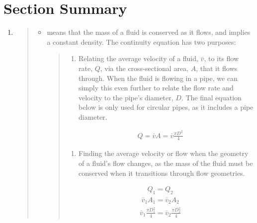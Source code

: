 \documentclass[letterpaper,10pt,english]{sphinxmanual}
\begin{document}
\section{Section Summary}
\label{\detokenize{Fluids_Review/Fluids_Review_Design:section-summary}}\label{\detokenize{Fluids_Review/Fluids_Review_Design:fr-section-summary}}\begin{enumerate}
\item {} 
\begin{quote}
\begin{itemize}
\item {} 
 means that the mass of a fluid is conserved as it flows, and implies a constant density. The continuity equation has two purposes:
\begin{quote}
\begin{enumerate}
\item {} 
Relating the average velocity of a fluid, \(\bar v\), to its flow rate, \(Q\), via the cross-sectional area, \(A\), that it flows through. When the fluid is flowing in a pipe, we can simply this even further to relate the flow rate and velocity to the pipe’s diameter, \(D\). The final equation below is only used for circular pipes, as it includes a pipe diameter.

\end{enumerate}
\begin{equation}\label{equation:Fluids_Review/Fluids_Review_Design:Fluids_Review/Fluids_Review_Design:33}
\begin{split}Q = \bar v A = \bar v \frac{\pi D^2}{4}\end{split}
\end{equation}\begin{enumerate}
\item {} 
Finding the average velocity or flow when the geometry of a fluid’s flow changes, as the mass of the fluid must be conserved when it transitions through flow geometries.

\end{enumerate}
\begin{equation}\label{equation:Fluids_Review/Fluids_Review_Design:Fluids_Review/Fluids_Review_Design:34}
\begin{split}Q_1 = Q_2\end{split}
\end{equation}\begin{equation}\label{equation:Fluids_Review/Fluids_Review_Design:Fluids_Review/Fluids_Review_Design:35}
\begin{split}\bar v_1 A_1 = \bar v_2 A_2\end{split}
\end{equation}\begin{equation}\label{equation:Fluids_Review/Fluids_Review_Design:Fluids_Review/Fluids_Review_Design:36}
\begin{split}\bar v_1 \frac{\pi D_1^2}{4} = \bar v_2 \frac{\pi D_2^2}{4}\end{split}
\end{equation}\end{quote}


\end{itemize}
\end{quote}
\end{enumerate}
\end{document}
